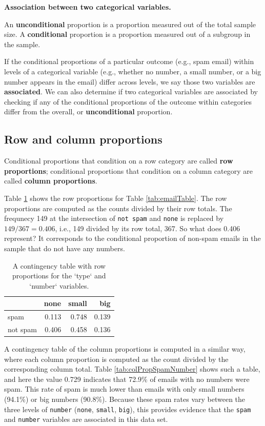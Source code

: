 \documentclass[
  10pt,
  openany]{book}
\theoremstyle{definition}
\theoremstyle{definition}
\theoremstyle{definition}
\theoremstyle{definition}
\theoremstyle{remark}
\begin{document}
\textbf{Association between two categorical variables.}

An \textbf{unconditional} proportion is a proportion measured out of the total sample size. A \textbf{conditional} proportion is a proportion measured out of a subgroup in the sample.

If the conditional proportions of a particular outcome (e.g., spam email) within levels of a categorical variable (e.g., whether no number, a small number, or a big number appears in the email) differ across levels, we say those two variables are \textbf{associated}. We can also determine if two categorical variables are associated by checking if any of the conditional proportions of the outcome within categories differ from the overall, or \textbf{unconditional} proportion.

\subsection{Row and column proportions}\label{row-and-column-proportions}

Conditional proportions that condition on a row category are called \textbf{row proportions}; conditional proportions that condition on a column category
are called \textbf{column proportions}.

Table \ref{tab:rowPropSpamNumber} shows the row proportions for Table \ref{tab:emailTable}. The row proportions are computed as the counts divided by their row totals. The frequnecy 149 at the intersection of \texttt{not\ spam} and \texttt{none} is replaced by \(149/367=0.406\), i.e., 149 divided by its row total, 367. So what does 0.406 represent? It corresponds to the conditional proportion of non-spam emails in the sample that do not have any numbers.

\begin{table}
\centering
\caption{\label{tab:rowPropSpamNumber}A contingency table with row proportions for the `type` and `number` variables.}
\centering
\begin{tabular}[t]{l|r|r|r}
\hline
  & none & small & big\\
\hline
spam & 0.113 & 0.748 & 0.139\\
\hline
not spam & 0.406 & 0.458 & 0.136\\
\hline
\end{tabular}
\end{table}

A contingency table of the column proportions is computed in a similar way, where each column proportion is computed as the count divided by the corresponding column total. Table \ref{tab:colPropSpamNumber} shows such a table, and here the value 0.729 indicates that 72.9\% of emails with no numbers were spam. This rate of spam is much lower than emails with only small numbers (94.1\%) or big numbers (90.8\%). Because these spam rates vary between the three levels of \texttt{number} (\texttt{none}, \texttt{small}, \texttt{big}), this provides evidence that the \texttt{spam} and \texttt{number} variables are associated in this data set.
\end{document}
